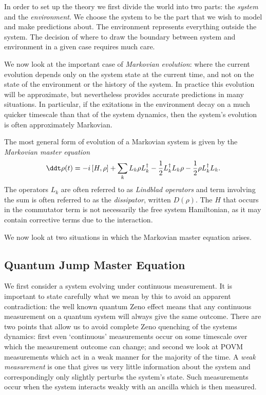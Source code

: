 In order to set up the theory we first divide the world into two parts: the \textit{system} and the \textit{environment}. We choose the system to be the part that we wish to model and make predictions about. The environment represents everything outside the system. The decision of where to draw the boundary between system and environment in a given case requires much care.

We now look at the important case of \textit{Markovian evolution}: where the current evolution depends only on the system state at the current time, and not on the state of the environment or the history of the system. In practice this evolution will be approximate, but nevertheless provides accurate predictions in many situations. In particular, if the exitations in the environment decay on a much quicker timescale than that of the system dynamics, then the system's evolution is often approximately Markovian.

The most general form \cite{lindblad} of evolution of a Markovian system is given by the \textit{Markovian master equation}
\begin{align}\label{master_eq}
  \ddt \rho(t) = -i \left[H, \rho\right] + \sum_k L_k \rho L_k^\dagger -\frac{1}{2} L_k^\dagger L_k \rho -\frac{1}{2} \rho L_k^\dagger L_k .
\end{align}
The operators $L_k$ are often referred to as \textit{Lindblad operators} and term involving the sum is often referred to as the \textit{dissipator}, written $D(\rho)$. The $H$ that occurs in the commutator term is not necessarily the free system Hamiltonian, as it may contain corrective terms due to the interaction.

We now look at two situations in which the Markovian master equation arises.

\subsection{Quantum Jump Master Equation}

We first consider a system evolving under continuous measurement. It is important to state carefully what we mean by this to avoid an apparent contradiction: the well known quantum Zeno effect means that any continuous measurement on a quantum system will always give the same outcome. There are two points that allow us to avoid complete Zeno quenching of the systems dynamics: first even `continuous' measurements occur on some timescale over which the measurement outcome can change; and second we look at POVM measurements which act in a weak manner for the majority of the time. A \textit{weak measurement} is one that gives us very little information about the system and correspondingly only slightly perturbs the system's state. Such measurements occur when the system interacts weakly with an ancilla which is then measured.


